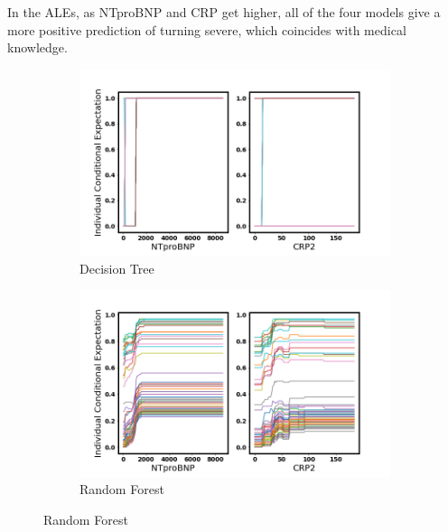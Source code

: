 In the ALEs,  as NTproBNP and CRP get higher, all of the four models give a more positive prediction of turning severe, which coincides with medical knowledge.

\clearpage

\null
\vfill

\begin{figure}[H]
\centering
\begin{subfigure}[b]{\textwidth}
    \centering
    \includegraphics[width=\textwidth]{figures/chapter_interp/dt_ice_crp_ntproBNP.png}
    \caption{Decision Tree}
    \label{fig:dt_ice}
\end{subfigure}
\hfill
\begin{subfigure}[b]{\textwidth}
    \centering
    \includegraphics[width=\textwidth]{figures/chapter_interp/rf_ice_crp_ntproBNP.png}
    \caption{Random Forest}
    \label{fig:rf_ice}
\end{subfigure}
\hfill
\end{figure}

\vfill


